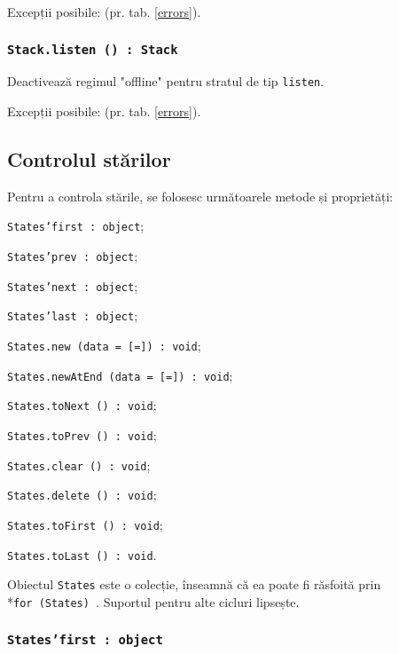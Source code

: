 Excepții posibile:  (pr. tab. \ref{errors}).

\subsubsection{\texttt{Stack.listen () : Stack}}

Deactivează regimul "offline" pentru stratul de tip \texttt{listen}.

Excepții posibile:  (pr. tab. \ref{errors}).

\subsection{Controlul stărilor}

Pentru a controla stările, se folosesc următoarele metode și proprietăți:
\begin{icItems}
	\item \texttt{States'first : object};
	\item \texttt{States'prev : object};
	\item \texttt{States'next : object};
	\item \texttt{States'last : object};
	\item \texttt{States.new (data = [=]) : void};
	\item \texttt{States.newAtEnd (data = [=]) : void};
	\item \texttt{States.toNext () : void};
	\item \texttt{States.toPrev () : void};
	\item \texttt{States.clear () : void};
	\item \texttt{States.delete () : void};
	\item \texttt{States.toFirst () : void};
	\item \texttt{States.toLast () : void}.
\end{icItems}

Obiectul \texttt{States} este o colecție, înseamnă că ea poate fi răsfoită prin \\*\texttt{for (States) {}}. Suportul pentru alte cicluri lipsește.

\subsubsection{\texttt{States'first : object}}

